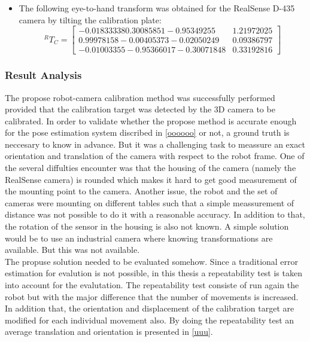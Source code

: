\begin{itemize}
\item The following eye-to-hand transform was obtained for the RealSense D-435 camera by tilting the calibration plate:
\begin{equation}
^{R}T_{C}=\begin{bmatrix} -0.01833338  0.30085851 -0.95349255 & 1.21972025\\0.99978158 -0.00405373 -0.02050249& 0.09386797\\ -0.01003355 -0.95366017 -0.30071848& 0.33192816\end{bmatrix}
\end{equation}
\end{itemize}


\subsubsection{Result Analysis}

The propose robot-camera calibration method was successfully performed provided that the calibration target was detected by the 3D camera to be calibrated. In order to validate whether the propose method is accurate enough for the pose estimation system discribed in \ref{oooooo} or not, a ground truth is neccesary to know in advance. But it was a challenging task to meassure an exact orientation and translation of the camera with respect to the robot frame. One of the several diffulties encounter was that the housing of the camera (namely the RealSense camera) is rounded which makes it hard to get good measurement of the mounting point to the camera. Another issue, the robot and the set of cameras were mounting on different tables such that a simple meassurement of distance was not possible to do it with a reasonable accuracy. In addition to that, the rotation of the sensor in the housing is also not known. A simple solution would be to use an industrial camera where knowing transformations are available. But this was not available. \\
The propuse solution needed to be evaluated somehow. Since a traditional error estimation for evalution is not possible, in this thesis a repeatability test is taken into account for the evalutation. The repeatability test consiste of run again the robot but with the major difference that the number of movements is increased. In addition that, the orientation and displacement of the calibration target are modified for each individual movement also. By doing the repeatability test an average translation and orientation is presented in \ref{uuu}.




